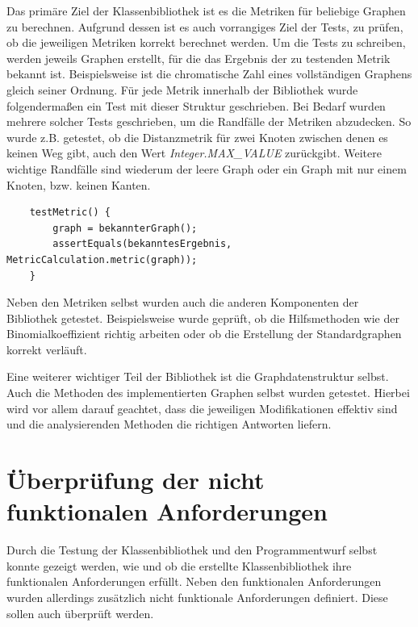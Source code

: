 \documentclass[a4paper,12pt,ngerman,chapterprefix=false,listof=totoc,bibliography=totoc]{scrreprt}
\begin{document}
{{{Das primäre Ziel der Klassenbibliothek ist es die Metriken für beliebige Graphen zu berechnen. Aufgrund dessen ist es auch vorrangiges Ziel der Tests, zu prüfen, ob die jeweiligen Metriken korrekt berechnet werden. Um die Tests zu schreiben, werden jeweils Graphen erstellt, für die das Ergebnis der zu testenden Metrik bekannt ist. Beispielsweise ist die chromatische Zahl eines vollständigen Graphens gleich seiner Ordnung. Für jede Metrik innerhalb der Bibliothek wurde folgendermaßen ein Test mit dieser Struktur geschrieben. Bei Bedarf wurden mehrere solcher Tests geschrieben, um die Randfälle der Metriken abzudecken. So wurde z.B. getestet, ob die Distanzmetrik für zwei Knoten zwischen denen es keinen Weg gibt, auch den Wert \textit{Integer.MAX\_VALUE} zurückgibt. Weitere wichtige Randfälle sind wiederum der leere Graph oder ein Graph mit nur einem Knoten, bzw. keinen Kanten.
\begin{lstlisting}
	testMetric() {
		graph = bekannterGraph();
		assertEquals(bekanntesErgebnis, MetricCalculation.metric(graph));
	}
\end{lstlisting}
Neben den Metriken selbst wurden auch die anderen Komponenten der Bibliothek getestet. Beispielsweise wurde geprüft, ob die Hilfsmethoden wie der Binomialkoeffizient richtig arbeiten oder ob die Erstellung der Standardgraphen korrekt verläuft.

Eine weiterer wichtiger Teil der Bibliothek ist die Graphdatenstruktur selbst. Auch die Methoden des implementierten Graphen selbst wurden getestet. Hierbei wird vor allem darauf geachtet, dass die jeweiligen Modifikationen effektiv sind und die analysierenden Methoden die richtigen Antworten liefern.
}
\section{Überprüfung der nicht funktionalen Anforderungen}
{
Durch die Testung der Klassenbibliothek und den Programmentwurf selbst konnte gezeigt werden, wie und ob die erstellte Klassenbibliothek ihre funktionalen Anforderungen erfüllt. Neben den funktionalen Anforderungen wurden allerdings zusätzlich nicht funktionale Anforderungen definiert. Diese sollen auch überprüft werden.

}}}
\end{document}

